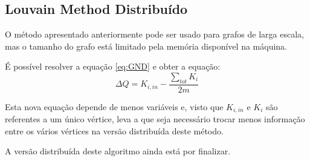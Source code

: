 \newpage
\subsection{Louvain Method Distribuído}
O método apresentado anteriormente pode ser usado para grafos de larga escala, mas o tamanho do grafo está limitado pela memória disponível na máquina.

É possível resolver a equação \ref{eq:GND} e obter a equação:
\begin{equation}
	\Delta Q  =  K_{i,in} - \frac{\sum_{tot} K_i}{2m}
\label{eq:GD}
\end{equation}


Esta nova equação depende de menos variáveis e, visto que $K_{i,in}$ e $K_i$ são referentes a um único vértice, leva a que seja necessário trocar menos informação entre os vários vértices na versão distribuída deste método.

A versão distribuída deste algoritmo ainda está por finalizar.

%


